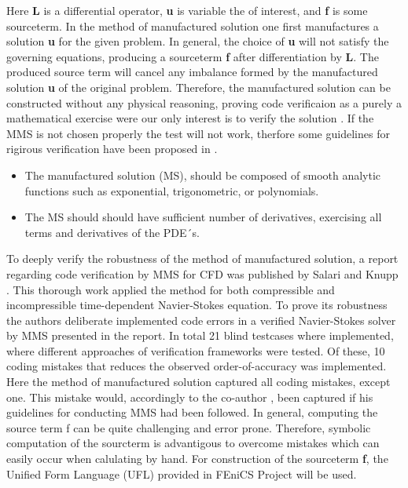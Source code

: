 Here \textbf{L} is a differential operator, \textbf{u} is variable the of interest, and \textbf{f} is some sourceterm. In the method of manufactured solution one first manufactures a solution \textbf{u} for the given problem. In general, the choice of \textbf{u} will not satisfy the governing equations, producing a sourceterm  \textbf{f} after differentiation by \textbf{L}. The produced source term will cancel any imbalance formed by the manufactured solution \textbf{u} of the original problem. Therefore, the manufactured solution can be constructed without any physical reasoning, proving code verificaion as a purely a mathematical exercise were our only interest is to verify the solution \cite{Roache2002}. If the MMS is not chosen properly the test will not work, therfore some guidelines for rigirous verification have been proposed in \cite{Etienne2006, Biggs, Roache2002}. 

\begin{itemize}
\item The manufactured solution (MS), should be composed of smooth analytic functions such as exponential, trigonometric, or polynomials.
\item The MS should should have sufficient number of derivatives, exercising all terms and derivatives of the PDE´s. 
\end{itemize}

To deeply verify the robustness of the method of manufactured solution,  a report regarding code verification by MMS for CFD was published by Salari and Knupp \cite{Biggs}. This thorough work applied the method for both compressible and incompressible time-dependent Navier-Stokes equation. To prove its robustness the authors deliberate implemented  code errors in a verified Navier-Stokes solver by MMS presented in the report. In total 21 blind testcases where implemented, where different approaches of verification frameworks were tested. 
Of these, 10 coding mistakes that reduces the observed order-of-accuracy was implemented. Here the method of manufactured solution captured all coding mistakes, except one. This mistake would, accordingly to the co-author , been captured if his guidelines for conducting MMS had been followed. 
In general, computing the source term f can be quite challenging and error prone.  Therefore, symbolic computation of the sourcterm is advantigous to overcome mistakes which can easily occur when calulating by hand. For construction of the sourceterm \textbf{f}, the Unified Form Language (UFL)  \cite{Alnæs2015} provided in FEniCS Project will be used. 

